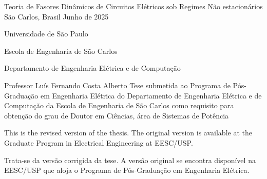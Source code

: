\documentclass{apaThesis}
\begin{document}

\printtitlepage

\printfrontmatter

\cleardoublepage
\anotherfrontmatter
{Teoria de Fasores Dinâmicos de Circuitos Elétricos sob Regimes Não estacionários}%
{\theauthor}%
{São Carlos, Brasil}%
{Junho de 2025}%
{Universidade de São Paulo \par %
Escola de Engenharia de São Carlos \par%
Departamento de Engenharia Elétrica e de Computação}%
{Professor Luís Fernando Costa Alberto}%
{Tese submetida ao Programa de Pós-Graduação em Engenharia Elétrica do Departamento de Engenharia Elétrica e de Computação da Escola de Engenharia de São Carlos como requisito para obtenção do grau de Doutor em Ciências, área de Sistemas de Potência}

\cleardoublepage
\thispagestyle{empty}
\vspace*{\fill}
\begin{center}

This is the revised version of the thesis. The original version is available at the Graduate Program in Electrical Engineering at EESC/USP.

\vspace{1cm}

Trata-se da versão corrigida da tese. A versão original se encontra disponível na EESC/USP que aloja o Programa de Pós-Graduação em Engenharia Elétrica.
\end{center}
\newpage
\end{document}
